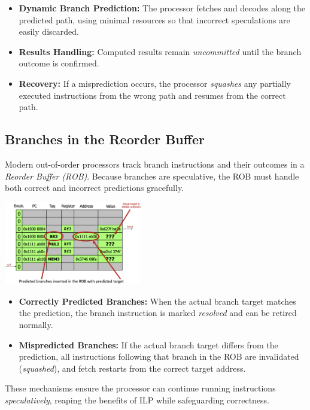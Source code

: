 \begin{itemize}
  \item \textbf{Dynamic Branch Prediction:} The processor fetches and decodes along the predicted path, using minimal resources so that incorrect speculations are easily discarded.
  \item \textbf{Results Handling:} Computed results remain \emph{uncommitted} until the branch outcome is confirmed.
  \item \textbf{Recovery:} If a misprediction occurs, the processor \emph{squashes} any partially executed instructions from the wrong path and resumes from the correct path.
\end{itemize}

\subsection{Branches in the Reorder Buffer}
Modern out-of-order processors track branch instructions and their outcomes in a \emph{Reorder Buffer (ROB)}. Because branches are speculative, the ROB must handle both correct and incorrect predictions gracefully.

\begin{center}
    \includegraphics[width=0.45\textwidth]{chapters/chapter4f/images/rob.png}
\end{center}

\begin{itemize}
    \item \textbf{Correctly Predicted Branches:}
    When the actual branch target matches the prediction, the branch instruction is marked \emph{resolved} and can be retired normally.
    \item \textbf{Mispredicted Branches:}
    If the actual branch target differs from the prediction, all instructions following that branch in the ROB are invalidated (\emph{squashed}), and fetch restarts from the correct target address.
\end{itemize}

These mechanisms ensure the processor can continue running instructions \emph{speculatively}, reaping the benefits of ILP while safeguarding correctness.

